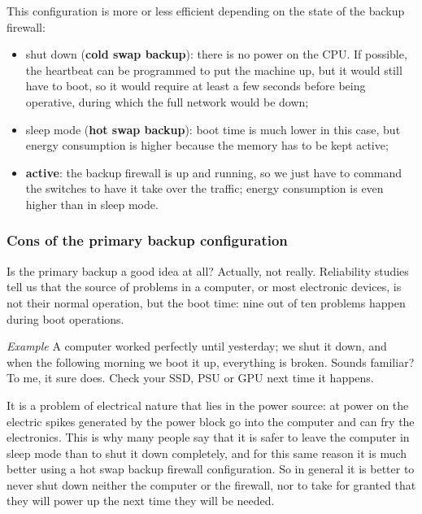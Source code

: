 This configuration is more or less efficient depending on the state of the backup firewall:

\begin{itemize}
    \item shut down (\textbf{cold swap backup}): there is no power on the CPU. If possible, the heartbeat can be programmed to put the machine up, but it would still have to boot, so it would require at least a few seconds before being operative, during which the full network would be down;
    \item sleep mode (\textbf{hot swap backup}): boot time is much lower in this case, but energy consumption is higher because the memory has to be kept active;
    \item \textbf{active}: the backup firewall is up and running, so we just have to command the switches to have it take over the traffic; energy consumption is even higher than in sleep mode.
\end{itemize}


\subsubsection*{Cons of the primary backup configuration}
Is the primary backup a good idea at all? Actually, not really. Reliability studies tell us that the source of problems in a computer, or most electronic devices, is not their normal operation, but the boot time: nine out of ten problems happen during boot operations.

\vspace{0.5em}

\emph{Example} A computer worked perfectly until yesterday; we shut it down, and when the following morning we boot it up, everything is broken. Sounds familiar? To me, it sure does. Check your SSD, PSU or GPU next time it happens.

\vspace{0.5em}

It is a problem of electrical nature that lies in the power source: at power on the electric spikes generated by the power block go into the computer and can fry the electronics. This is why many people say that it is safer to leave the computer in sleep mode than to shut it down completely, and for this same reason it is much better using a hot swap backup firewall configuration. So in general it is better to never shut down neither the computer or the firewall, nor to take for granted that they will power up the next time they will be needed.

